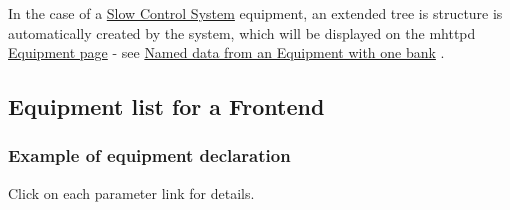 In the case of a \hyperlink{FE_Slow_Control_system}{Slow Control System} equipment, an extended tree is structure is automatically created by the system, which will be displayed on the mhttpd \hyperlink{RC_mhttpd_Equipment_page}{Equipment page} -\/ see \hyperlink{RC_mhttpd_Equipment_page_RC_mhttpd_Equipment_example2}{Named data from an Equipment with one bank} .

\par
 \label{index_end}
\hypertarget{index_end}{}
  \subsection{Equipment list for a Frontend}\label{FE_eqdec}


\par
 \label{FE_eqdec_idx_Equipment_declaration}
\hypertarget{FE_eqdec_idx_Equipment_declaration}{}
 \hypertarget{FE_eqdec_FE_Example_equipment_structure}{}\subsubsection{Example of equipment declaration}\label{FE_eqdec_FE_Example_equipment_structure}
 Click on each parameter link for details. 

